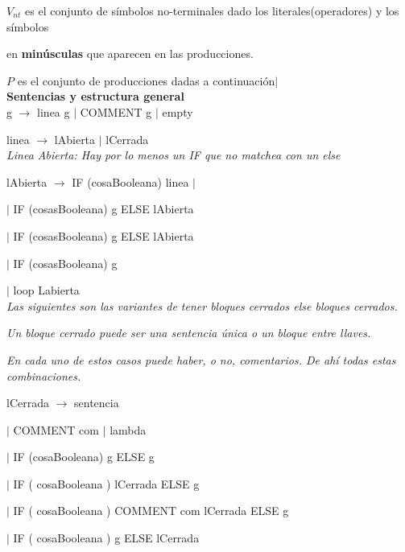 \documentclass[10pt, a4paper]{article}
\begin{document}
$V_{nt}$ es el conjunto de símbolos no-terminales dado los literales(operadores) y los símbolos

en \textbf{minúsculas} que aparecen en las producciones.



$P$ es el conjunto de producciones dadas a continuación$|$\\


\textbf{Sentencias y estructura general} \\

g $\rightarrow$ linea g $|$ COMMENT g $|$ empty 

linea $\rightarrow$ lAbierta $|$ lCerrada \\


\textit{Linea Abierta: Hay por lo menos un IF que no matchea con un else} 

lAbierta $\rightarrow$ IF (cosaBooleana) linea $|$

\hspace{15mm}$|$ IF (cosasBooleana) {g} ELSE lAbierta

\hspace{15mm}$|$ IF (cosasBooleana) {g} ELSE lAbierta

\hspace{15mm}$|$ IF (cosasBooleana) {g} 

\hspace{15mm}$|$ loop Labierta \\

\textit{Las siguientes son las variantes de tener bloques cerrados else bloques cerrados.}

\textit{Un bloque cerrado puede ser una sentencia única o un bloque entre llaves.}

\textit{En cada uno de estos casos puede haber, o no, comentarios. De ahí todas estas combinaciones.} 


lCerrada $\rightarrow$ sentencia

\hspace{15mm}$|$ COMMENT com $|$ lambda

\hspace{15mm}$|$ IF (cosaBooleana) {g} ELSE {g}

\hspace{15mm}$|$ IF ( cosaBooleana ) lCerrada ELSE { g } 

\hspace{15mm}$|$ IF ( cosaBooleana ) COMMENT com lCerrada ELSE { g } 

\hspace{15mm}$|$ IF ( cosaBooleana ) { g } ELSE lCerrada 
\end{document}
